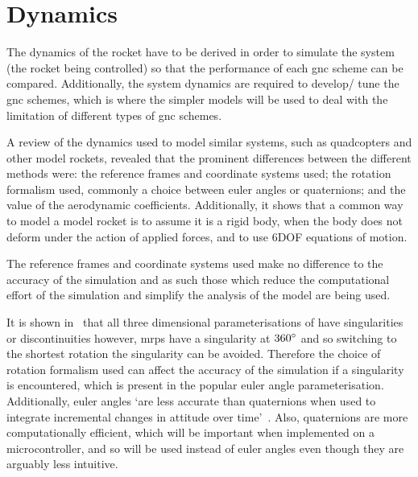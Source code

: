 \section{Dynamics}
\label{sec:Dynamics}

The dynamics of the rocket have to be derived in order to simulate the system (the rocket being controlled) so that the performance of each \gls{gnc} scheme can be compared. 
Additionally, the system dynamics are required to develop/ tune the \gls{gnc} schemes, which is where the simpler models will be used to deal with the limitation of different types of \gls{gnc} schemes.

A review of the dynamics used to model similar systems, such as quadcopters and other model rockets, revealed that the prominent differences between the different methods were: the reference frames and coordinate systems used; the rotation formalism used, commonly a choice between euler angles or quaternions; and the value of the aerodynamic coefficients.
Additionally, it shows that a common way to model a model rocket is to assume it is a rigid body, when the body does not deform under the action of applied forces, and to use 6DOF equations of motion.

The reference frames and coordinate systems used make no difference to the accuracy of the simulation and as such those which reduce the computational effort of the simulation and simplify the analysis of the model are being used.

It is shown in~\cite{Stu1964} that all three dimensional parameterisations of  have singularities or discontinuities however, \glspl{mrp} have a singularity at $360\degree$ and so switching to the shortest rotation the singularity can be avoided.
Therefore the choice of rotation formalism used can affect the accuracy of the simulation if a singularity is encountered, which is present in the popular euler angle parameterisation.
Additionally, euler angles `are less accurate than quaternions when used to integrate incremental changes in \gls{attitude} over time'~\cite{Representing}.
Also, quaternions are more computationally efficient, which will be important when implemented on a microcontroller, and so will be used instead of euler angles even though they are arguably less intuitive.

